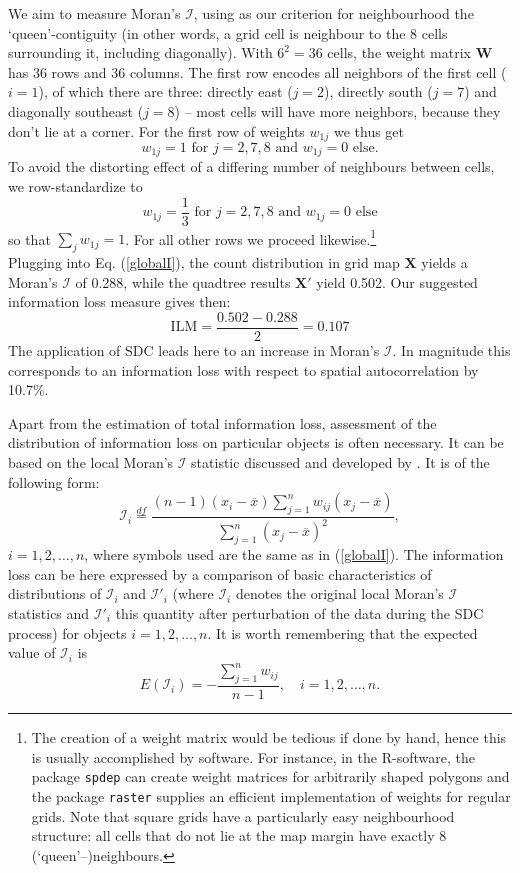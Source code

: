 \begin{tcolorbox}[breakable]
We aim to measure Moran's $\mathcal{I}$, using as our criterion for neighbourhood the `queen'-contiguity (in other words, a grid cell is neighbour to the 8 cells surrounding it, including diagonally). With $6^2 = 36$ cells, the weight matrix $\mathbf{W}$ has 36 rows and 36 columns. The first row encodes all neighbors of the first cell ($i = 1$), of which there are three: directly east ($j = 2$), directly south ($j = 7$) and diagonally southeast ($j = 8$) -- most cells will have more neighbors, because they don't lie at a corner. For the first row of weights $w_{1j}$ we thus get
\[
w_{1j} = 1 \text{ for } j = 2,7,8 \text{ and } w_{1j} = 0 \text{ else}.
\]
To avoid the distorting effect of a differing number of neighbours between cells, we row-standardize to
\[
w_{1j} = \frac{1}{3} \text{ for } j = 2,7,8 \text{ and } w_{1j} = 0 \text{ else}
\]
so that $\sum_j w_{1j} = 1$. For all other rows we proceed likewise.\footnote{
    The creation of a weight matrix would be tedious if done by hand, hence this is usually accomplished by software. For instance, in the R-software, the package \texttt{spdep} can create weight matrices for arbitrarily shaped polygons and the package \texttt{raster} supplies an efficient implementation of weights for regular grids. Note that square grids have a particularly easy neighbourhood structure: all cells that do not lie at the map margin have exactly 8 (`queen'--)neighbours.}\\

Plugging into Eq. (\ref{globalI}), the count distribution in grid map $\mathbf{X}$ yields a Moran's $\mathcal{I}$ of 0.288, while the quadtree results $\mathbf{X}'$ yield 0.502. Our suggested information loss measure gives then:
\[
\mathrm{ILM}=\frac{0.502-0.288}{2}=0.107
\]
The application of SDC leads here to an increase in Moran's $\mathcal{I}$. In magnitude this corresponds to an information loss with respect to spatial autocorrelation by 10.7\%.    

\end{tcolorbox}

Apart from the estimation of total information loss, assessment of the distribution of information loss on particular objects is often necessary. It can be based on the local Moran's $\mathcal{I}$ statistic discussed and developed by \cite{Anselin1995}. It is of the following form:
\begin{equation}
 \mathcal{I}_i\stackrel{df}{=}\frac{(n-1)(x_i-\overline{x})\sum_{j=1}^n{w_{ij}(x_j-\overline{x})}}{\sum_{j=1}^n{(x_j-\overline{x})^2}},
\label{localI}
\end{equation}
$i=1,2,\ldots,n$, where symbols used are the same as in (\ref{globalI}). The information loss can be here expressed by a comparison of basic characteristics of distributions of $\mathcal{I}_i$ and $\mathcal{I}'_i$ (where $\mathcal{I}_i$ denotes the original local Moran's $\mathcal{I}$ statistics and $\mathcal{I}'_i$ this quantity after perturbation of the data during the SDC process) for objects $i=1,2,\ldots,n$. It is worth remembering that the expected value of $\mathcal{I}_i$ is
\[
E(\mathcal{I}_i)=-\frac{\sum_{j=1}^n{w_{ij}}}{n-1},\quad i=1,2,\ldots,n.
\]


